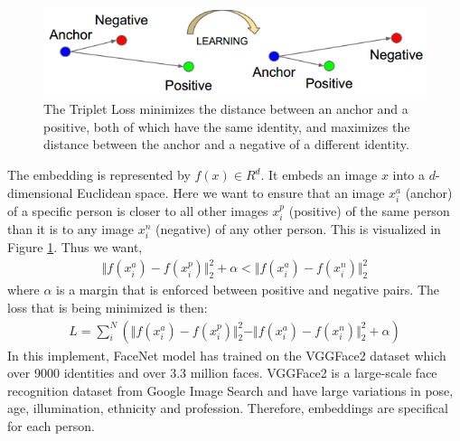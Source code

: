 \documentclass[journal, twocolumn]{IEEEtran}
\begin{document}
\begin{figure}
    \centering
    \includegraphics[width=1\linewidth]{img/triplet.png}
	\caption{The Triplet Loss minimizes the distance between an anchor and a positive, both of which have the same identity, and maximizes the distance between the anchor and a negative of a different identity.}
	\label{fig:triplet}
\end{figure}

The embedding is represented by $f(x) \in R^d$. It embeds an image $x$ into a $d$-dimensional Euclidean space. Here we want to ensure that an image $x_i^a$ (anchor) of a specific person is closer to all other images $x_i^p$ (positive) of the same person than it is to any image $x_i^n$ (negative) of any other person. This is visualized in Figure \ref{fig:triplet}. Thus we want, 
\begin{align}
	\Vert f(x_i^a) - f(x_i^p) \Vert_2^2 + \alpha < \Vert f(x_i^a) - f(x_i^n) \Vert_2^2
\end{align}
where $\alpha$ is a margin that is enforced between positive and negative pairs. The loss that is being minimized is then: 
\begin{align}
	L = \sum_i^N(\Vert f(x_i^a) - f(x_i^p) \Vert_2^2  - \Vert f(x_i^a) - f(x_i^n) \Vert_2^2 + \alpha)
\end{align}
In this implement, FaceNet model has trained on the VGGFace2 dataset which over 9000 identities and over 3.3 million faces. VGGFace2 is a large-scale face recognition dataset from Google Image Search and have large variations in pose, age, illumination, ethnicity and profession. Therefore, embeddings are specifical for each person.


\end{document}
